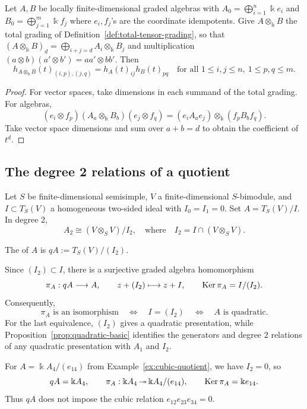 \begin{lemma}\label{lem:hilbert-field-tensor}
Let $A,B$ be locally finite-dimensional graded algebras with $A_0=\bigoplus_{i=1}^n\Bbbk e_i$ and $B_0=\bigoplus_{j=1}^m\Bbbk f_j$ where $e_i, f_j$'s are the coordinate idempotents.
Give $A\otimes_\Bbbk B$ the total grading of Definition~\ref{def:total-tensor-grading}, so that $(A\otimes_\Bbbk B)_d=\bigoplus_{i+j=d}A_i\otimes_\Bbbk B_j$ and multiplication
$(a\otimes b)(a'\otimes b')=aa'\otimes bb'$.
Then
\[
h_{A\otimes_\Bbbk B}(t)_{(i,p),(j,q)}
=h_A(t)_{ij}h_B(t)_{pq}
\quad\text{for all }1\leq i,j\leq n,\ 1\leq p,q\leq m.
\]
\end{lemma}
\begin{proof}
For vector spaces, take dimensions in each summand of the total grading.
For algebras,
\[
(e_i\otimes f_p)(A_a\otimes_\Bbbk B_b)(e_j\otimes f_q)
=(e_iA_ae_j)\otimes_\Bbbk(f_pB_bf_q).
\]
Take vector space dimensions and sum over $a+b=d$ to obtain the coefficient of $t^d$.
\end{proof}




\begin{advanced}[suppressfirstparskip=true,innertopmargin=0pt]
\subsection{The degree 2 relations of a quotient}

Let $S$ be finite-dimensional semisimple, $V$ a finite-dimensional $S$-bimodule, and $I\subset T_S(V)$ a homogeneous two-sided ideal with $I_0=I_1=0$.
Set $A=T_S(V)/I$.
In degree $2$,
\[
A_2\cong(V\otimes_S V)/I_2,
\quad\text{where}\quad
I_2=I\cap(V\otimes_S V).
\]

\begin{definition}\label{def:quadratic-part}
The  of $A$ is $qA:=T_S(V)/(I_2)$.
\end{definition}

Since $(I_2)\subset I$, there is a surjective graded algebra homomorphism
\[
\pi_A:qA\longrightarrow A,\qquad z+(I_2)\longmapsto z+I,
\qquad \operatorname{Ker}\nolimits\pi_A=I/(I_2).
\]
Consequently,
\[
\pi_A\text{ is an isomorphism}
\quad\Longleftrightarrow\quad I=(I_2)
\quad\Longleftrightarrow\quad A\text{ is quadratic}.
\]
For the last equivalence, $(I_2)$ gives a quadratic presentation, while Proposition~\ref{prop:quadratic-basic} identifies the generators and degree $2$ relations of any quadratic presentation with $A_1$ and $I_2$.

\begin{example}
For $A=\Bbbk A_4/(e_{14})$ from Example~\ref{ex:cubic-quotient}, we have $I_2=0$, so
\[
qA=\Bbbk A_4,\qquad
\pi_A:\Bbbk A_4\operatorname{\twoheadrightarrow}\Bbbk A_4/(e_{14}),\qquad
\operatorname{Ker}\nolimits\pi_A=\Bbbk e_{14}.
\]
Thus $qA$ does not impose the cubic relation $e_{12}e_{23}e_{34}=0$.
\end{example}
\end{advanced}

